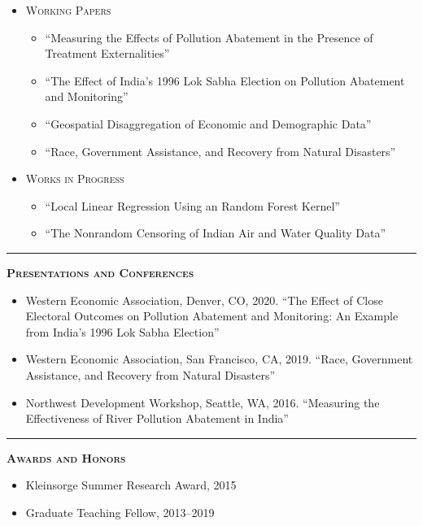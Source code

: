 \documentclass[12pt]{article}
\begin{document}
\begin{itemize}
\item[] \textsc{Working Papers}
\begin{itemize}[]
\item[] ``Measuring the Effects of Pollution Abatement in the Presence of Treatment \mbox{Externalities}''
\item[] ``The Effect of India's 1996 Lok Sabha Election on Pollution Abatement and Monitoring''
\item[] ``Geospatial Disaggregation of Economic and Demographic Data''
\item[] ``Race, Government Assistance, and Recovery from Natural Disasters''  
\end{itemize}

\item[] \textsc{Works in Progress}
  \begin{itemize}[]
\item[] ``Local Linear Regression Using an Random Forest Kernel''
\item[] ``The Nonrandom Censoring of Indian Air and Water Quality Data''
\end{itemize}
\end{itemize}

\bigskip
\hrule
\bigskip 
\noindent \textsc{\large \textbf{Presentations and Conferences}}

\begin{itemize}
\item[] Western Economic Association, Denver, CO, 2020. ``The Effect of Close Electoral Outcomes on Pollution Abatement and Monitoring: An Example from India's 1996 Lok Sabha Election''    
\item[] Western Economic Association, San Francisco, CA, 2019. ``Race, Government Assistance, and Recovery from Natural Disasters''  
\item[] Northwest Development Workshop, Seattle, WA, 2016. ``Measuring the Effectiveness of River Pollution Abatement in India''
\end{itemize}

\bigskip
\hrule
\bigskip 
\noindent \textsc{\large \textbf{Awards and Honors}}

\begin{itemize}
\item[] Kleinsorge Summer Research Award, 2015
\item[] Graduate Teaching Fellow, 2013--2019
\end{itemize}
\end{document}
